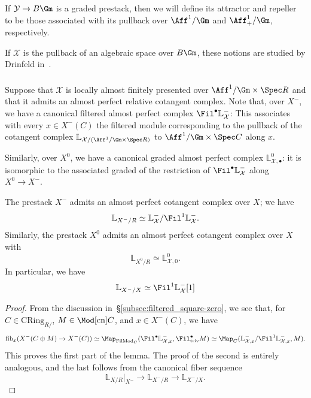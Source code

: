 \documentclass[10pt]{amsart}
\begin{document}
If $\mathcal{Y}\to B\Gm$ is a graded prestack, then we will define its attractor and repeller to be those associated with its pullback over $\Aff^1/\Gm$ and $\Aff^1_+/\Gm$, respectively.

\begin{remark}
If $\mathcal{X}$ is the pullback of an algebraic space over $B\Gm$, these notions are studied by Drinfeld in~\cite{drinfeld2015algebraic}.
\end{remark}

\subsubsection{}
\label{subsec:attractor_cotangent_complex}
Suppose that $\mathcal{X}$ is locally almost finitely presented over $\Aff^1/\Gm\times \Spec R$ and that it admits an almost perfect relative cotangent complex. Note that, over $X^-$, we have a canonical filtered almost perfect complex $\Fil^\bullet\mathbb{L}^-_{\mathcal{X}}$: This associates with every $x\in X^-(C)$ the filtered module corresponding to the pullback of the cotangent complex $\mathbb{L}_{\mathcal{X}/(\Aff^1/\Gm\times\Spec R)}$ to $\Aff^1/\Gm\times \Spec C$ along $x$. 

Similarly, over $X^0$, we have a canonical graded almost perfect complex $\mathbb{L}^0_{\mathcal{X},\bullet}$: it is isomorphic to the associated graded of the restriction of $\Fil^\bullet\mathbb{L}^-_{\mathcal{X}}$ along $X^0\to X^-$.

\begin{lemma}
\label{lem:attractor_cotangent_complex}
The prestack $X^-$ admits an almost perfect cotangent complex over $X$; we have
\[
\mathbb{L}_{X^-/R} \simeq \mathbb{L}^-_{\mathcal{X}}/\Fil^1\mathbb{L}^-_{\mathcal{X}}.
\]
Similarly, the prestack $X^0$ admits an almost perfect cotangent complex over $X$ with
\[
\mathbb{L}_{X^0/R} \simeq \mathbb{L}^0_{\mathcal{X},0}.
\]
In particular, we have
\[
\mathbb{L}_{X^-/X}\simeq \Fil^1\mathbb{L}^-_{\mathcal{X}}[1]
\]
\end{lemma}
\begin{proof}
From the discussion in~\S\ref{subsec:filtered_square-zero}, we see that, for $C\in \mathrm{CRing}_{R/}$, $M\in \Mod[\mathrm{cn}]{C}$, and $x\in X^-(C)$, we have
\[
\mathrm{fib}_x(X^-(C\oplus M)\to X^-(C))\simeq \Map_{\mathrm{FilMod}_C}(\Fil^\bullet\mathbb{L}^-_{\mathcal{X},x},\Fil^\bullet_{\mathrm{triv}}M)\simeq \Map_{{C}}(\mathbb{L}^-_{\mathcal{X},x}/\Fil^1\mathbb{L}^-_{\mathcal{X},x},M).
\]
This proves the first part of the lemma. The proof of the second is entirely analogous, and the last follows from the canonical fiber sequence
\[
\mathbb{L}_{X/R}\vert_{X^-}\to \mathbb{L}_{X^-/R}\to \mathbb{L}_{X^-/X}.
\]
\end{proof}
\end{document}
